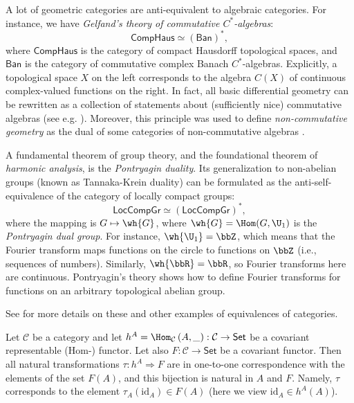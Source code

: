 %
\begin{example}
    A lot of geometric categories are anti-equivalent to algebraic categories.
    For instance, we have \emph{Gelfand's theory of commutative $C^{\ast}$-algebras}:
    \[
    \mathsf{CompHaus}\simeq\left(\mathsf{Ban}\right)^{\ast},
    \]
    where $\mathsf{CompHaus}$ is the category of compact Hausdorff topological
    spaces, and $\mathsf{Ban}$ is the category of commutative complex
    Banach $C^{\ast}$-algebras. Explicitly, a topological space $X$
    on the left corresponds to the algebra $C\left(X\right)$ of continuous
    complex-valued functions on the right. In fact, all basic differential
    geometry can be rewritten as a collection of statements about (sufficiently nice)
    commutative algebras (see e.g. \cite{JetNest}). Moreover, this principle was used to define \emph{non-commutative geometry} as the dual of some categories of non-commutative algebras \cite{Connes}.
\end{example}
%
\begin{example}
    A fundamental theorem of group theory, and the foundational theorem
    of \emph{harmonic analysis}, is the \emph{Pontryagin duality}.
    Its generalization to non-abelian groups (known as Tannaka-Krein duality)
    can be formulated as the anti-self-equivalence of the category of
    locally compact groups:
    \[
    \mathsf{LocCompGr}\simeq\left(\mathsf{LocCompGr}\right)^{\ast},
    \]
    where the mapping is $G\mapsto\wh{G}$, where $\wh{G}=\Hom(G,\U_1)$ is the \emph{Pontryagin dual group}.  For instance, $\wh{\U_1}=\bbZ$, which means that the
    Fourier transform maps functions on the circle to functions on $\bbZ$
    (i.e., sequences of numbers). Similarly, $\wh{\bbR }=\bbR $,
    so Fourier transforms here are continuous. Pontryagin's theory shows
    how to define Fourier transforms for functions on an arbitrary topological
    abelian group.

    See \cite[II.2]{GelMan} for more details on these and other examples
    of equivalences of categories.
\end{example}
\begin{thm}\label{Yoneda}
    Let $\mathcal{C}$ be a category and let $h^{A}=\Hom_{\mathcal{C}}\left(A,\_\right):\mathcal{C}\to\mathsf{Set}$
    be a covariant representable (Hom-) functor. Let also $F:\mathcal{C}\to\mathsf{Set}$
    be a covariant functor. Then all natural transformations $\tau:h^{A}\Longrightarrow F$
    are in one-to-one correspondence with the elements of the set $F(A)$,
    and this bijection is natural in $A$ and $F$. Namely, $\tau$ corresponds to the element $\tau_A(\mathrm{id}_A)\in F(A)$ (here we view $\mathrm{id}_A\in h^A(A)$).
\end{thm}
